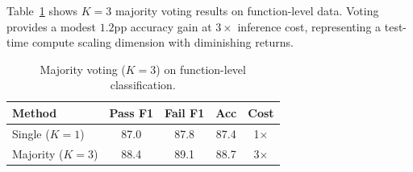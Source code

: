 \documentclass[11pt,a4paper]{article}
\begin{document}
Table~\ref{tab:voting} shows $K{=}3$ majority voting results on function-level data. Voting provides a modest $1.2$pp accuracy gain at $3{\times}$ inference cost, representing a test-time compute scaling dimension with diminishing returns.

\begin{table}[h]
\centering
\small
\caption{Majority voting ($K{=}3$) on function-level classification.}
\label{tab:voting}
\begin{tabular}{lcccc}
\toprule
\textbf{Method} & \textbf{Pass F1} & \textbf{Fail F1} & \textbf{Acc} & \textbf{Cost} \\
\midrule
Single ($K{=}1$) & 87.0 & 87.8 & 87.4 & 1$\times$ \\
Majority ($K{=}3$) & 88.4 & 89.1 & 88.7 & 3$\times$ \\
\bottomrule
\end{tabular}
\end{table}
\end{document}
